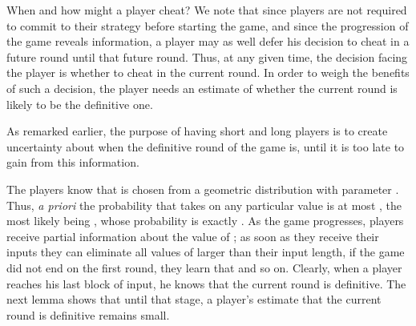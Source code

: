 \documentclass[12pt]{article}
\theoremstyle{definition}
\begin{document}
\smallskip

When and how might a player cheat? We note that since players are not 
required to commit to their strategy before starting the game, and
since the progression of the game reveals information, a player may as 
well defer his decision to cheat in a future round until that future round. 
Thus, at any given time, the decision facing the player is whether to 
cheat in the current round. In order to weigh the benefits 
of such a decision, the player needs an estimate of whether the current 
round is likely to be the definitive one. 

As remarked earlier, the purpose of having short and long players is to 
create uncertainty about when the definitive round of the game is, until it 
is too late to gain from this information.  

The players know that  is chosen from a geometric distribution with 
parameter . Thus, \emph{a priori} the 
probability that  takes on any particular value is at most , 
the most likely being , whose probability is exactly . 
As the game progresses, players receive partial information about the 
value of ; as soon as they receive their inputs they can eliminate all
values of  larger than their input length, if the game did not end on 
the first round, they learn that  and so on. Clearly, when a 
player reaches his last block of input, he knows that the current round 
is definitive. The next lemma shows that until that stage, a player's 
estimate that the current round is definitive remains small. 
\end{document}
